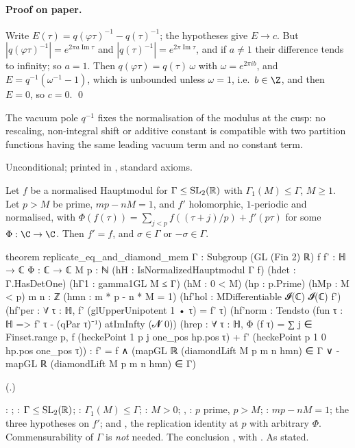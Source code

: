 \paragraph{Proof on paper.}  Write $E(\tau)=q(\varphi\tau)^{-1}-q(\tau)^{-1}$; the hypotheses give $E\to c$.  But
$|q(\varphi\tau)^{-1}|=e^{2\pi a\operatorname{Im}\tau}$ and $|q(\tau)^{-1}|=e^{2\pi\operatorname{Im}\tau}$, and if
$a\ne1$ their difference tends to infinity; so $a=1$.  Then $q(\varphi\tau)=q(\tau)\,\omega$ with $\omega=e^{2\pi ib}$,
and $E=q^{-1}(\omega^{-1}-1)$, which is unbounded unless $\omega=1$, i.e.\ $b\in\Z$, and then $E=0$, so $c=0$. \qed
\begin{physics}
The vacuum pole $q^{-1}$ fixes the normalisation of the modulus at the cusp: no rescaling, non-integral shift or
additive constant is compatible with two partition functions having the same leading vacuum term and no constant term.
\end{physics}
\begin{status}
Unconditional; printed in , standard axioms.
\end{status}

\begin{theorem}\label{ch16:thm:main}
Let $f$ be a normalised Hauptmodul for $\Gamma\le\mathrm{SL}_2(\mathbb{R})$ with $\Gamma_1(M)\le\Gamma$, $M\ge1$.  Let $p>M$ be prime,
$mp-nM=1$, and $f'$ holomorphic, $1$-periodic and normalised, with
$\Phi(f(\tau))=\sum_{j<p}f((\tau+j)/p)+f'(p\tau)$ for some $\Phi:\C\to\C$.  Then $f'=f$, and $\sigma\in\Gamma$ or
$-\sigma\in\Gamma$.
\end{theorem}
\begin{leancode}
theorem replicate_eq_and_diamond_mem {Γ : Subgroup (GL (Fin 2) ℝ)} {f f' : ℍ → ℂ}
    {Φ : ℂ → ℂ} {M p : ℕ} (hH : IsNormalizedHauptmodul Γ f) (hdet : Γ.HasDetOne)
    (hΓ1 : gamma1GL M ≤ Γ) (hM : 0 < M) (hp : p.Prime) (hMp : M < p) {m n : ℤ}
    (hmn : m * p - n * M = 1) (hf'hol : MDifferentiable 𝓘(ℂ) 𝓘(ℂ) f')
    (hf'per : ∀ τ : ℍ, f' (glUpperUnipotent 1 • τ) = f' τ)
    (hf'norm : Tendsto (fun τ : ℍ => f' τ - (qPar τ)⁻¹) atImInfty (𝓝 0))
    (hrep : ∀ τ : ℍ, Φ (f τ) = ∑ j ∈ Finset.range p, f (heckePoint 1 p j one_pos hp.pos τ) +
      f' (heckePoint p 1 0 hp.pos one_pos τ)) :
    f' = f ∧ (mapGL ℝ (diamondLift M p m n hmn) ∈ Γ ∨ -mapGL ℝ (diamondLift M p m n hmn) ∈ Γ)
\end{leancode}
(.)
\begin{dictionary}
: ; : $\Gamma\le\mathrm{SL}_2(\mathbb{R})$; : $\Gamma_1(M)\le\Gamma$;
: $M>0$; , : $p$ prime, $p>M$; : $mp-nM=1$; the three hypotheses on $f'$; and
, the replication identity at $p$ with arbitrary $\Phi$.  Commensurability of $\Gamma$ is \emph{not} needed.
The conclusion , with .  As stated.
\end{dictionary}
